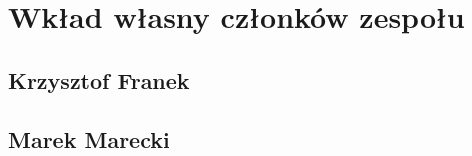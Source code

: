 \chapter{Wkład własny członków zespołu}
\label{wklad_wlasny}

\section{Krzysztof Franek}

\section{Marek Marecki}
